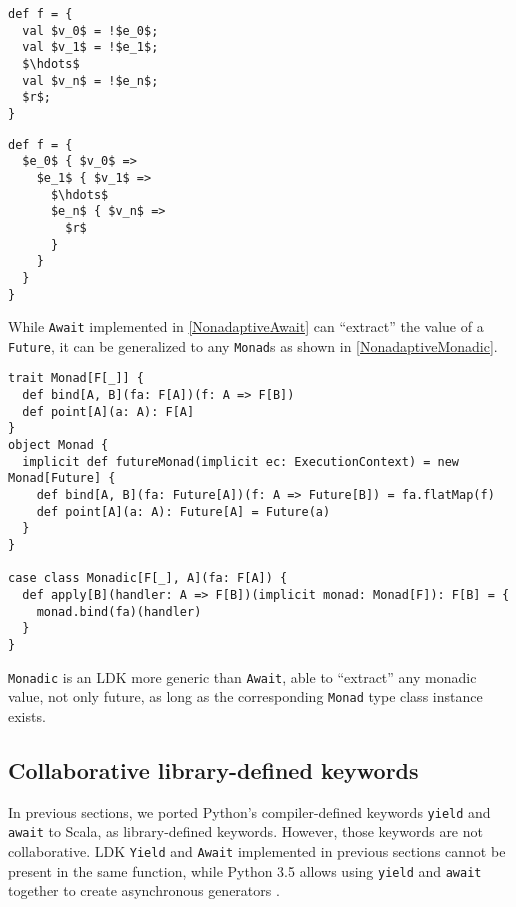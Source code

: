 \begin{lstlisting}[mathescape=true, caption={A function with !-notation}, label={bang-block}]
def f = {
  val $v_0$ = !$e_0$;
  val $v_1$ = !$e_1$;
  $\hdots$
  val $v_n$ = !$e_n$;
  $r$;
}
\end{lstlisting}

\begin{lstlisting}[mathescape=true,caption={The code converted from !-notation by our name-based CPS-transformation plug-ins}, label={cps-block}]
def f = {
  $e_0$ { $v_0$ =>
    $e_1$ { $v_1$ =>
      $\hdots$
      $e_n$ { $v_n$ =>
        $r$
      }
    }
  }
}
\end{lstlisting}

While \lstinline{Await} implemented in \cref{NonadaptiveAwait} can ``extract'' the value of a \lstinline{Future}, it can be generalized to any \lstinline{Monad}s as shown in \cref{NonadaptiveMonadic}.

\begin{lstlisting}[caption={Implementing \lstinline{Monadic} LDK as a forwarder to \lstinline{Monad}},label={NonadaptiveMonadic}]
trait Monad[F[_]] {
  def bind[A, B](fa: F[A])(f: A => F[B])
  def point[A](a: A): F[A]
}
object Monad {
  implicit def futureMonad(implicit ec: ExecutionContext) = new Monad[Future] {
    def bind[A, B](fa: Future[A])(f: A => Future[B]) = fa.flatMap(f)
    def point[A](a: A): Future[A] = Future(a)
  }
}

case class Monadic[F[_], A](fa: F[A]) {
  def apply[B](handler: A => F[B])(implicit monad: Monad[F]): F[B] = {
    monad.bind(fa)(handler)
  }
}
\end{lstlisting}

\lstinline{Monadic} is an LDK more generic than \lstinline{Await}, able to ``extract'' any monadic value, not only future, as long as the corresponding \lstinline{Monad} type class instance exists.

\subsection{Collaborative library-defined keywords}\label{Collaborative library-defined keywords}

In previous sections, we ported Python's compiler-defined keywords \lstinline{yield} and \lstinline{await} to Scala, as library-defined keywords. However, those keywords are not collaborative. LDK \lstinline{Yield} and \lstinline{Await} implemented in previous sections cannot be present in the same function, while Python 3.5 allows using \lstinline{yield} and \lstinline{await} together to create asynchronous generators \cite{pep525}.


